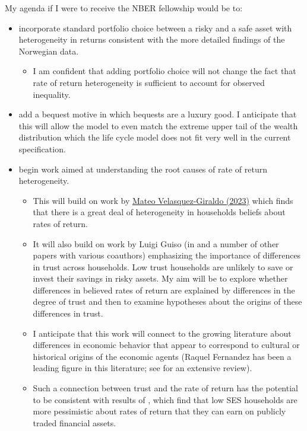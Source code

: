 \documentclass[\econtexRoot/Chp1proposal]{subfiles}
\begin{document}
\par My agenda if I were to receive the NBER fellowship would be to:
\begin{itemize}
\item incorporate standard portfolio choice between a risky and a safe asset with heterogeneity in returns consistent with the more detailed findings of the Norwegian data.
  \begin{itemize}
    \item I am confident that adding portfolio choice will not change the fact that rate of return heterogeneity is sufficient to account for observed inequality.
  \end{itemize}
\item add a bequest motive in which bequests are a luxury good. I anticipate that this will allow the model to even match the extreme upper tail of the wealth distribution which the life cycle model does not fit very well in the current specification.
\item begin work aimed at understanding the root causes of rate of return heterogeneity.
  \begin{itemize}
  \item This will build on work by \href{https://econ.jhu.edu/directory/mateo-velasquez-giraldo/}{Mateo Velasquez-Giraldo (2023)} which finds that there is a great deal of heterogeneity in households beliefs about rates of return.
  \item It will also build on work by Luigi Guiso (in \cite{lgpslz2008} and a number of other papers with various coauthors) emphasizing the importance of differences in trust across households. Low trust households are unlikely to save or invest their savings in risky assets. My aim will be to explore whether differences in believed rates of return are explained by differences in the degree of trust and then to examine hypotheses about the origins of these differences in trust.
  \item I anticipate that this work will connect to the growing literature about differences in economic behavior that appear to correspond to cultural or historical origins of the economic agents (Raquel Fernandez has been a leading figure in this literature; see \cite{Fernandez2011} for an extensive review).
    \item Such a connection between trust and the rate of return has the potential to be consistent with results of \cite{Das2019}, which find that low SES households are more pessimistic about rates of return that they can earn on publicly traded financial assets.
    \end{itemize}
\end{itemize}
\end{document}

